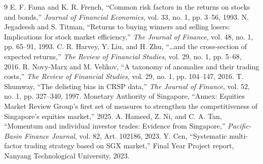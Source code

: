 \documentclass[11pt,a4paper]{article}
\begin{document}
\begin{thebibliography}{9}
 E. F. Fama and K. R. French, ``Common risk factors in the returns on stocks and bonds,'' \textit{Journal of Financial Economics}, vol. 33, no. 1, pp. 3--56, 1993.
 N. Jegadeesh and S. Titman, ``Returns to buying winners and selling losers: Implications for stock market efficiency,'' \textit{The Journal of Finance}, vol. 48, no. 1, pp. 65--91, 1993.
 C. R. Harvey, Y. Liu, and H. Zhu, ``\ldots and the cross-section of expected returns,'' \textit{The Review of Financial Studies}, vol. 29, no. 1, pp. 5--68, 2016.
 R. Novy-Marx and M. Velikov, ``A taxonomy of anomalies and their trading costs,'' \textit{The Review of Financial Studies}, vol. 29, no. 1, pp. 104--147, 2016.
 T. Shumway, ``The delisting bias in CRSP data,'' \textit{The Journal of Finance}, vol. 52, no. 1, pp. 327--340, 1997.
 Monetary Authority of Singapore, ``Annex: Equities Market Review Group's first set of measures to strengthen the competitiveness of Singapore's equities market,'' 2025.
 A. Hameed, Z. Ni, and C. A. Tan, ``Momentum and individual investor trades: Evidence from Singapore,'' \textit{Pacific-Basin Finance Journal}, vol. 82, Art. 102186, 2023.
 Y. Cen, ``Systematic multi-factor trading strategy based on SGX market,'' Final Year Project report, Nanyang Technological University, 2023.
\end{thebibliography}
\end{document}
